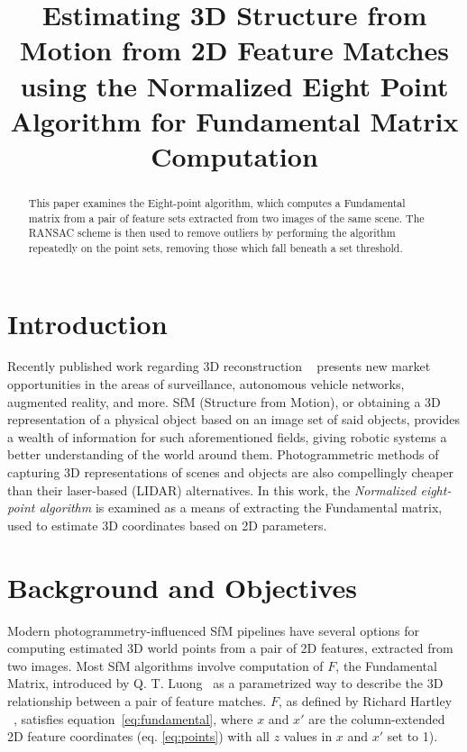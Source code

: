 \documentclass[Conference]{IEEEtran}
\title{Estimating 3D Structure from Motion from 2D Feature Matches using the Normalized Eight Point Algorithm for Fundamental Matrix Computation}
\begin{document}
\author{
}

\maketitle

\begin{abstract}
This paper examines the Eight-point algorithm, which computes a Fundamental matrix from a pair of feature sets extracted from two images of the same scene. The RANSAC scheme is then used to remove outliers by performing the algorithm repeatedly on the point sets, removing those which fall beneath a set threshold.
\end{abstract}

\section{Introduction}
Recently published work regarding 3D reconstruction ~\cite{Hartley2004} presents new market opportunities in the areas of surveillance, autonomous vehicle networks, augmented reality, and more. SfM (Structure from Motion), or obtaining a 3D representation of a physical object based on an image set of said objects, provides a wealth of information for such aforementioned fields, giving robotic systems a better understanding of the world around them. Photogrammetric methods of capturing 3D representations of scenes and objects are also compellingly cheaper than their laser-based (LIDAR) alternatives.
In this work, the \textit{Normalized eight-point algorithm} is examined as a means of extracting the Fundamental matrix, used to estimate 3D coordinates based on 2D parameters.

\section{Background and Objectives}
Modern photogrammetry-influenced SfM pipelines have several options for computing estimated 3D world points from a pair of 2D features, extracted from two images. Most SfM algorithms involve computation of $F$, the Fundamental Matrix, introduced by Q. T. Luong~\cite{AICPub329:1992} as a parametrized way to describe the 3D relationship between a pair of feature matches. $F$, as defined by Richard Hartley ~\cite{Hartley2004}, satisfies equation~\ref{eq:fundamental}, where $x$ and $x'$ are the column-extended 2D feature coordinates (eq. \ref{eq:points}) with all $z$ values in $x$ and $x'$ set to 1).
\end{document}
